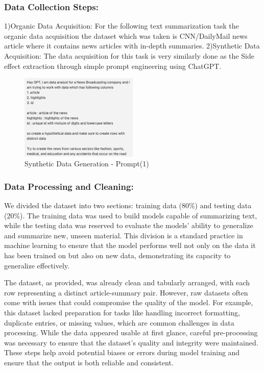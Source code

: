\documentclass[sigplan,screen]{acmart}
\begin{document}
\subsubsection{Data Collection Steps:}
1)Organic Data Acquisition: For the following text summarization task the organic data acquisition the dataset which was taken is CNN/DailyMail news article where it contains news articles with in-depth summaries.
2)Synthetic Data Acquisition: The data acquisition for this task is very similarly done as the Side effect extraction through simple prompt engineering using ChatGPT.
\begin{figure}[htbp]
    \centering
    \includegraphics[width=0.5\textwidth]{Text Summarization - Prompt.png}  %
    \caption{Synthetic Data Generation - Prompt(1)}
    \label{fig:your_label}
\end{figure}
\subsubsection{Data Processing and Cleaning:}

We divided the dataset into two sections: training data (80\%) and testing data (20\%). The training data was used to build models capable of summarizing text, while the testing data was reserved to evaluate the models' ability to generalize and summarize new, unseen material. This division is a standard practice in machine learning to ensure that the model performs well not only on the data it has been trained on but also on new data, demonstrating its capacity to generalize effectively.

The dataset, as provided, was already clean and tabularly arranged, with each row representing a distinct article-summary pair. However, raw datasets often come with issues that could compromise the quality of the model. For example, this dataset lacked preparation for tasks like handling incorrect formatting, duplicate entries, or missing values, which are common challenges in data processing. While the data appeared usable at first glance, careful pre-processing was necessary to ensure that the dataset’s quality and integrity were maintained. These steps help avoid potential biases or errors during model training and ensure that the output is both reliable and consistent.
\end{document}
